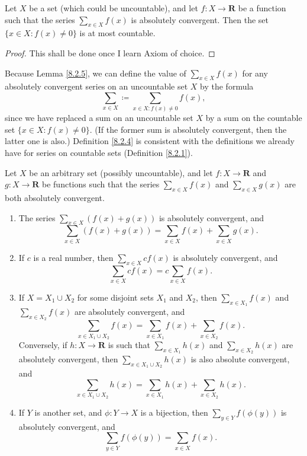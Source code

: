 \begin{lemma}\label{8.2.5}
Let \(X\) be a set (which could be uncountable), and let \(f : X \to \mathbf{R}\) be a function such that the series \(\sum_{x \in X} f(x)\) is absolutely convergent.
Then the set \(\{x \in X : f(x) \neq 0\}\) is at most countable.
\end{lemma}

\begin{proof}
This shall be done once I learn Axiom of choice.
\end{proof}

\begin{note}
Because Lemma \ref{8.2.5}, we can define the value of \(\sum_{x \in X} f(x)\) for any absolutely convergent series on an uncountable set \(X\) by the formula
\[
    \sum_{x \in X} \coloneqq \sum_{x \in X : f(x) \neq 0} f(x),
\]
since we have replaced a sum on an uncountable set \(X\) by a sum on the countable set \(\{x \in X : f(x) \neq 0\}\).
(If the former sum is absolutely convergent, then the latter one is also.)
Definition \ref{8.2.4} is consistent with the definitions we already have for series on countable sets (Definition \ref{8.2.1}).
\end{note}

\begin{proposition}\label{8.2.6}
Let \(X\) be an arbitrary set (possibly uncountable), and let \(f : X \to \mathbf{R}\) and \(g : X \to \mathbf{R}\) be functions such that the series \(\sum_{x \in X} f(x)\) and \(\sum_{x \in X} g(x)\) are both absolutely convergent.
\begin{enumerate}
    \item The series \(\sum_{x \in X} (f(x) + g(x))\) is absolutely convergent, and
    \[
        \sum_{x \in X} (f(x) + g(x)) = \sum_{x \in X} f(x) + \sum_{x \in X} g(x).
    \]
    \item If \(c\) is a real number, then \(\sum_{x \in X} cf(x)\) is absolutely convergent, and
    \[
        \sum_{x \in X} cf(x) = c \sum_{x \in X} f(x).
    \]
    \item If \(X = X_1 \cup X_2\) for some disjoint sets \(X_1\) and \(X_2\), then \(\sum_{x \in X_1} f(x)\) and \(\sum_{x \in X_2} f(x)\) are absolutely convergent, and
    \[
        \sum_{x \in X_1 \cup X_2} f(x) = \sum_{x \in X_1} f(x) + \sum_{x \in X_2} f(x).
    \]
    Conversely, if \(h : X \to \mathbf{R}\) is such that \(\sum_{x \in X_1} h(x)\) and \(\sum_{x \in X_2} h(x)\) are absolutely convergent, then \(\sum_{x \in X_1 \cup X_2} h(x)\) is also absolute convergent, and
    \[
        \sum_{x \in X_1 \cup X_2} h(x) = \sum_{x \in X_1} h(x) + \sum_{x \in X_2} h(x).
    \]
    \item If \(Y\) is another set, and \(\phi : Y \to X\) is a bijection, then \(\sum_{y \in Y} f(\phi(y))\) is absolutely convergent, and
    \[
        \sum_{y \in Y} f(\phi(y)) = \sum_{x \in X} f(x).
    \]
\end{enumerate}
\end{proposition}

